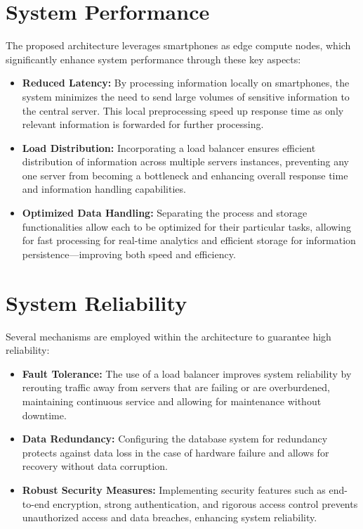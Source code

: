 \section{System Performance}

The proposed architecture leverages smartphones as edge compute nodes, which
significantly enhance system performance through these key aspects:

\begin{itemize}
    \item \textbf{Reduced Latency:} By processing information locally on
          smartphones, the system minimizes the need to send large volumes of
          sensitive information to the central server. This local preprocessing
          speed up response time as only relevant information is forwarded for
          further processing.
    \item \textbf{Load Distribution:} Incorporating a load balancer ensures
          efficient distribution of information across multiple servers
          instances, preventing any one server from becoming a bottleneck and
          enhancing overall response time and information handling capabilities.
    \item \textbf{Optimized Data Handling:} Separating the process and storage
          functionalities allow each to be optimized for their particular tasks,
          allowing for fast processing for real-time analytics and efficient
          storage for information persistence—improving both speed and
          efficiency.
\end{itemize}

\section{System Reliability}

Several mechanisms are employed within the architecture to guarantee high
reliability:

\begin{itemize}
    \item \textbf{Fault Tolerance:} The use of a load balancer improves system
          reliability by rerouting traffic away from servers that are failing or
          are overburdened, maintaining continuous service and allowing for
          maintenance without downtime.
    \item \textbf{Data Redundancy:} Configuring the database system for
          redundancy protects against data loss in the case of hardware failure
          and allows for recovery without data corruption.
    \item \textbf{Robust Security Measures:} Implementing security features such
          as end-to-end encryption, strong authentication, and rigorous access
          control prevents unauthorized access and data breaches, enhancing
          system reliability.
\end{itemize}

